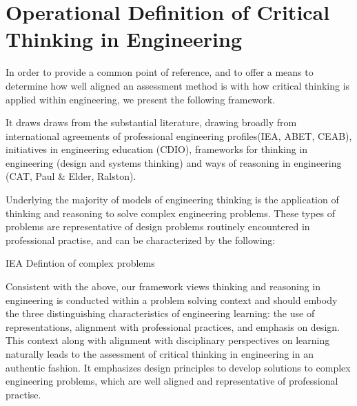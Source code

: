 \section{Operational Definition of Critical Thinking in Engineering}

In order to provide a common point of reference, and to offer a means to determine how well aligned an assessment method is with how critical thinking is applied within engineering, we present the following framework.  

It draws draws from the substantial literature, drawing broadly from international agreements of professional engineering profiles(IEA, ABET, CEAB), initiatives in engineering education (CDIO), frameworks for thinking in engineering (design and systems thinking) and ways of reasoning in engineering (CAT, Paul & Elder, Ralston). 

Underlying the majority of models of engineering thinking is the application of thinking and reasoning to solve complex engineering problems. These types of problems are representative of design problems routinely encountered in professional practise, and can be characterized by the following: 

{IEA Defintion of complex problems}

Consistent with the above, our framework views thinking and reasoning in engineering is conducted within a problem solving context and should embody the three distinguishing characteristics of engineering learning: the use of representations, alignment with professional practices, and emphasis on design\cite{Johri:2014tk}. This context along with alignment with disciplinary perspectives on learning naturally leads to the assessment of critical thinking in engineering in an authentic fashion.  It emphasizes design principles to develop solutions to  complex engineering problems, which are well aligned and representative of professional practise.

